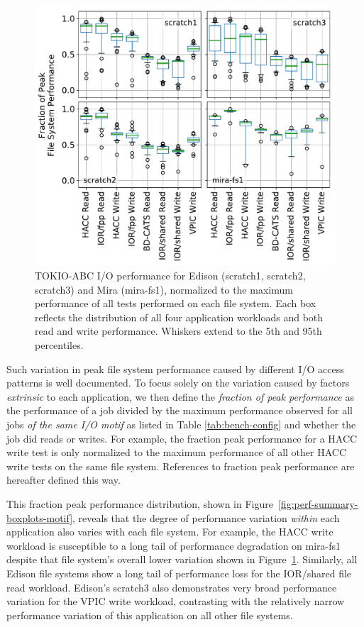 \begin{figure}[t]
    \centering
    \includegraphics[width=1.0\columnwidth]{figs/perf-boxplots-per-fs.pdf}
    \caption{TOKIO-ABC I/O performance for Edison (scratch1, scratch2, scratch3) and Mira (mira-fs1), normalized to the maximum performance of all tests performed on each file system.
    Each box reflects the distribution of all four application workloads and both read and write performance.
    Whiskers extend to the 5th and 95th percentiles.}
    \label{fig:perf-summary-boxplots-fs}
\end{figure}

Such variation in peak file system performance caused by different I/O access patterns is well documented\cite{Lofstead2010,Uselton2010,Xie2012}.
To focus solely on the variation caused by factors \emph{extrinsic} to each application, we then define the \emph{fraction of peak performance} as the performance of a job divided by the maximum performance observed for all jobs \emph{of the same I/O motif} as listed in Table \ref{tab:bench-config} and whether the job did reads or writes.
For example, the fraction peak performance for a HACC write test is only normalized to the maximum performance of all other HACC write tests on the same file system.
References to fraction peak performance are hereafter defined this way.

This fraction peak performance distribution, shown in Figure~\ref{fig:perf-summary-boxplots-motif}, reveals that the degree of performance variation \emph{within} each application also varies with each file system.
For example, the HACC write workload is susceptible to a long tail of performance degradation on mira-fs1 despite that file system's overall lower variation shown in Figure~\ref{fig:perf-summary-boxplots-fs}.
Similarly, all Edison file systems show a long tail of performance loss for the IOR/shared file read workload.
Edison's scratch3 also demonstrates very broad performance variation for the VPIC write workload, contrasting with the relatively narrow performance variation of this application on all other file systems.

